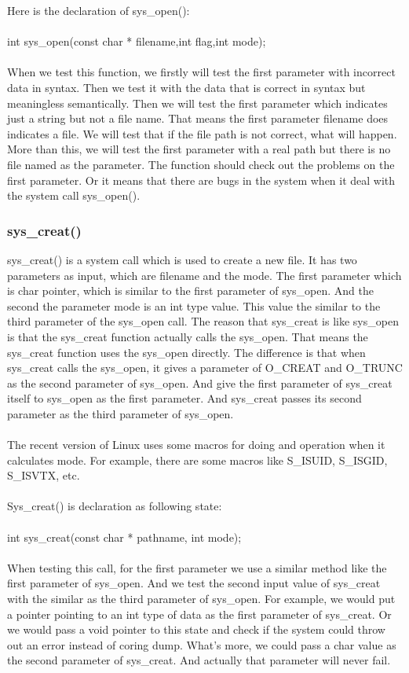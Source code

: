 \documentclass[twoside]{article}
\begin{document}
\begin{multicols}{2}
Here is the declaration of sys\_open():\\\\
int sys\_open(const char * filename,int flag,int mode);\\\\
When we test this function, we firstly will test the first parameter with incorrect data in syntax. Then we test it with the data that is correct in syntax but meaningless semantically. Then we will test the first parameter which indicates just a string but not a file name. That means the first parameter filename does indicates a file. We will test that if the file path is not correct, what will happen. More than this, we will test the first parameter with a real path but there is no file named as the parameter. The function should check out the problems on the first parameter. Or it means that there are bugs in the system when it deal with the system call sys\_open().
\subsubsection{sys\_creat()}
sys\_creat() is a system call which is used to create a new file. It has two parameters as input, which are filename and the mode. The first parameter which is char pointer, which is similar to the first parameter of sys\_open. And the second the parameter mode is an int type value. This value the similar to the third parameter of the sys\_open call. The reason that sys\_creat is like sys\_open is that the sys\_creat function actually calls the sys\_open. That means the sys\_creat function uses the sys\_open directly. The difference is that when sys\_creat calls the sys\_open, it gives a parameter of O\_CREAT and O\_TRUNC as the second parameter of sys\_open. And give the first parameter of sys\_creat itself to sys\_open as the first parameter. And sys\_creat passes its second parameter as the third parameter of sys\_open.\\\\
The recent version of Linux uses some macros for doing and operation when it calculates mode. For example, there are some macros like S\_ISUID, S\_ISGID, S\_ISVTX, etc.\\\\
Sys\_creat() is declaration as following state:\\\\
int sys\_creat(const char * pathname, int mode);\\\\
When testing this call, for the first parameter we use a similar method like the first parameter of sys\_open. And we test the second input value of sys\_creat with the similar as the third parameter of sys\_open. For example, we would put a pointer pointing to an int type of data as the first parameter of sys\_creat. Or we would pass a void pointer to this state and check if the system could throw out an error instead of coring dump. What’s more, we could pass a char value as the second parameter of sys\_creat. And actually that parameter will never fail.

\end{multicols}
\end{document}
